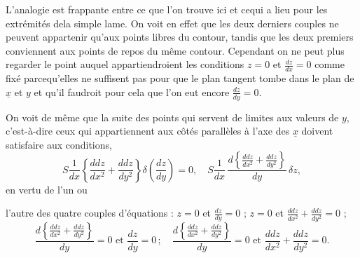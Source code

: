 \documentclass[11pt,a4paper]{article}
\begin{document}
L'analogie est frappante entre ce que l'on trouve ici et cequi
a lieu pour les extrémités dela simple lame. On voit en effet
que les deux derniers couples ne peuvent appartenir qu'aux points
libres du contour, tandis que les deux premiers conviennent aux points
de repos du même contour. Cependant on ne peut plus regarder
le point auquel appartiendroient les conditions $z=0$ et $\frac{dz}{dx}=0$
comme fixé parcequ'elles ne suffisent pas pour que le plan tangent
tombe dans le plan de $\underline{x}$ et $y$ et qu'il faudroit pour cela
que l'on eut encore $\frac{dz}{dy}=0$.

On voit de même que la suite des points qui servent de
limites aux valeurs de $y$, c'est-à-dire ceux qui appartiennent
aux côtés parallèles à l'axe des $\underline{x}$ doivent satisfaire aux conditions,
\[ S\frac{1}{dx}\left\{\frac{ddz}{dx^2}+\frac{ddz}{dy^2}\right\}\delta\!\left(\frac{dz}{dy}\right)=0, \quad S\frac{1}{dx}\,\frac{d\left\{\frac{ddz}{dx^2}+\frac{ddz}{dy^2}\right\}}{dy}\,\delta z, \]
en vertu de l'un ou



l'autre des quatre couples d'équations : $z=0$ et $\frac{dz}{dy}=0$ ; $z=0$ et $\frac{ddz}{dx^2}+\frac{ddz}{dy^2}=0$ ;
\[ \frac{d\left\{\frac{ddz}{dx^2}+\frac{ddz}{dy^2}\right\}}{dy}=0 \text{ et } \frac{dz}{dy}=0\,; \quad \frac{d\left\{\frac{ddz}{dx^2}+\frac{ddz}{dy^2}\right\}}{dy}=0 \text{ et } \frac{ddz}{dx^2}+\frac{ddz}{dy^2}=0. \]
\end{document}
